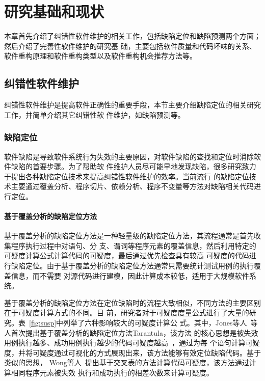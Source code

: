 
\chapter{研究基础和现状}
本章首先介绍了纠错性软件维护的相关工作，包括缺陷定位和缺陷预测两个方面；然后介绍了完善性软件维护的研究基
础，主要包括软件质量和代码坏味的关系、软件重构原理和软件重构类型以及软件重构机会推荐方法等。
\section{纠错性软件维护}
纠错性软件维护是提高软件正确性的重要手段，本节主要介绍缺陷定位的相关研究工作，并简单介绍其它纠错性软
件维护，如缺陷预测等。

\subsection{缺陷定位}
软件缺陷是导致软件系统行为失效的主要原因，对软件缺陷的查找和定位时消除软件缺陷的首要步骤。为了帮助软
件维护人员尽可能早地发现缺陷，很多研究致力于提出各种缺陷定位技术来提高纠错性软件维护的效率。当前流行
的缺陷定位技术主要通过覆盖分析、程序切片、依赖分析、程序不变量等方法对缺陷相关代码进行定位。

\subsubsection{基于覆盖分析的缺陷定位方法}
基于覆盖分析的缺陷定位方法是一种轻量级的缺陷定位方法，其流程通常是首先收集程序执行过程中对语句、分
支、谓词等程序元素的覆盖信息，然后利用特定的可疑度计算公式计算代码的可疑度，最后通过优先检查具有较高
可疑度的代码进行缺陷定位。由于基于覆盖分析的缺陷定位方法通常只需要统计测试用例的执行覆盖信息，而不需要
对源代码进行建模，因此计算成本较低，适用于大规模软件系统。

基于覆盖分析的缺陷定位方法在定位缺陷时的流程大致相似，不同方法的主要区别在于可疑度计算方式的不同。目
前，研究者对于可疑度度量公式进行了大量的研究。表~\ref{fig:susp}中列举了六种影响较大的可疑度计算公
式。其中，Jones等人~\cite{jones2005empirical}等人首次提出基于覆盖分析的缺陷定位方法Tarantula，该方法
的核心思想是被失效用例执行越多、成功用例执行越少的代码可疑度越高~\cite{jones2005empirical}，通过为每
个语句计算可疑度，并将可疑度通过可视化的方式展现出来，该方法能够有效定位缺陷代码。基于类似的思想，
Wong等人~\cite{wong2008crosstab}提出基于交叉表的方法计算代码可疑度，该方法通过计算相同程序元素被失效
执行和成功执行的相差次数来计算可疑度。

